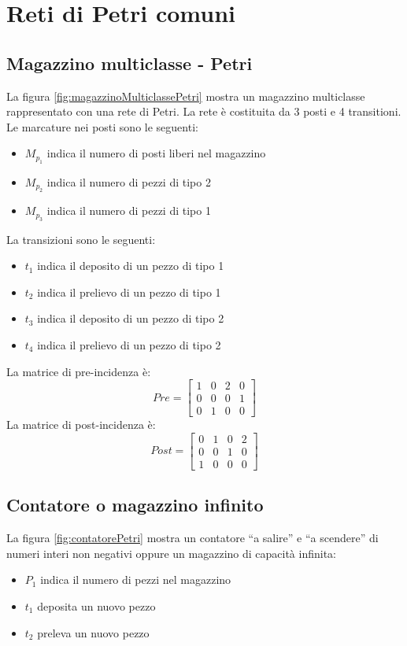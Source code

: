 \documentclass[a4paper]{report}
\begin{document}
\section{Reti di Petri comuni}
\subsection{Magazzino multiclasse - Petri}

La figura \ref{fig:magazzinoMulticlassePetri} mostra un magazzino
multiclasse rappresentato con una rete di Petri. La rete \`e
costituita da 3 posti e 4 transitioni.
Le marcature nei posti sono le seguenti:
\begin{itemize}
\item $M_{p_1}$ indica il numero di posti liberi nel magazzino
\item $M_{p_2}$ indica il numero di pezzi di tipo 2
\item $M_{p_3}$ indica il numero di pezzi di tipo 1
\end{itemize}
La transizioni sono le seguenti:
\begin{itemize}
\item $t_1$ indica il deposito di un pezzo di tipo 1
\item $t_2$ indica il prelievo di un pezzo di tipo 1
\item $t_3$ indica il deposito di un pezzo di tipo 2
\item $t_4$ indica il prelievo di un pezzo di tipo 2
\end{itemize}
La matrice di pre-incidenza \`e:
\[
Pre = 
\begin{bmatrix}
  1 & 0 & 2 & 0\\
  0 & 0 & 0 & 1\\
  0 & 1 & 0 & 0
\end{bmatrix}
\]
La matrice di post-incidenza \`e:
\[
Post =
\begin{bmatrix}
  0 & 1 & 0 & 2\\
  0 & 0 & 1 & 0\\
  1 & 0 & 0 & 0
\end{bmatrix}
\]

\subsection{Contatore o magazzino infinito}
La figura \ref{fig:contatorePetri} mostra un contatore ``a salire'' e
``a scendere'' di numeri interi non negativi oppure un magazzino di
capacit\`a infinita:
\begin{itemize}
\item $P_1$ indica il numero di pezzi nel magazzino
\item $t_1$ deposita un nuovo pezzo
\item $t_2$ preleva un nuovo pezzo
\end{itemize}

\end{document}
